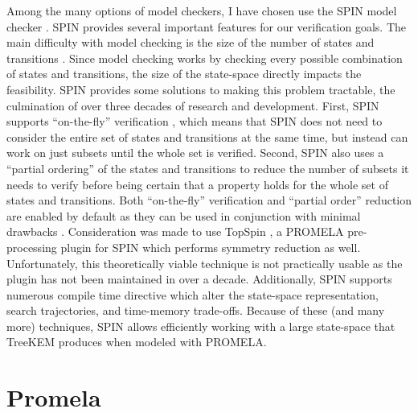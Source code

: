 Among the many options of model checkers, I have chosen use the SPIN model checker \autocite{godefroid1990using, holzmann1997model}.
SPIN provides several important features for our verification goals.
The main difficulty with model checking is the size of the number of states and transitions \autocite{burch1992symbolic}.
Since model checking works by checking every possible combination of states and transitions, the size of the state-space directly impacts the feasibility.
SPIN provides some solutions to making this problem tractable, the culmination of over three decades of research and development.
First, SPIN supports ``on-the-fly'' verification \autocite{rudin1987limits}, which means that SPIN does not need to consider the entire set of states and transitions at the same time, but instead can work on just subsets until the whole set is verified.
Second, SPIN also uses a ``partial ordering'' of the states and transitions \autocite{shannon1958note} to reduce the number of subsets it needs to verify before being certain that a property holds for the whole set of states and transitions.
Both ``on-the-fly'' verification and ``partial order'' reduction are enabled by default as they can be used in conjunction with minimal drawbacks \autocite{valmari1993fly, peled1994combining, holzmann1995improvement, couvreur1999fly}.
Consideration was made to use TopSpin \autocite{DonaldsonM_AMAST2006}, a PROMELA pre-processing plugin for SPIN which performs symmetry reduction as well.
Unfortunately, this theoretically viable technique is not practically usable as the plugin has not been maintained in over a decade.
Additionally, SPIN supports numerous compile time directive which alter the state-space representation, search trajectories, and time-memory trade-offs.
Because of these (and many more) techniques, SPIN allows efficiently working with a large state-space that TreeKEM produces when modeled with PROMELA.\@


\hypertarget{sec:promela}{%
\section{Promela}\label{sec:promela}}

